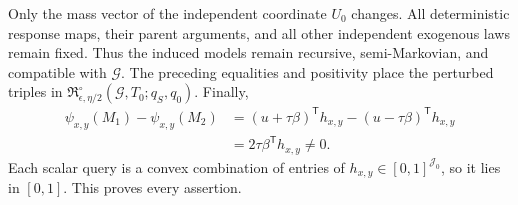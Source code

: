 Only the mass vector of the independent coordinate \(U_0\) changes.  All deterministic response maps, their parent arguments, and all other independent exogenous laws remain fixed.  Thus the induced models remain recursive, semi-Markovian, and compatible with \(\mathcal G\).  The preceding equalities and positivity place the perturbed triples in \(\mathfrak R_{\epsilon,\eta/2}^{\circ}(\mathcal G,T_0;q_S,q_0)\).  Finally,
\[
 \begin{aligned}
 \psi_{x,y}(M_1)-\psi_{x,y}(M_2)
 &=(u+\tau\beta)^{\mathsf T}h_{x,y}-(u-\tau\beta)^{\mathsf T}h_{x,y}\\
 &=2\tau\beta^{\mathsf T}h_{x,y}\neq0.
 \end{aligned}
\]
Each scalar query is a convex combination of entries of \(h_{x,y}\in[0,1]^{\mathcal J_0}\), so it lies in \([0,1]\).  This proves every assertion.